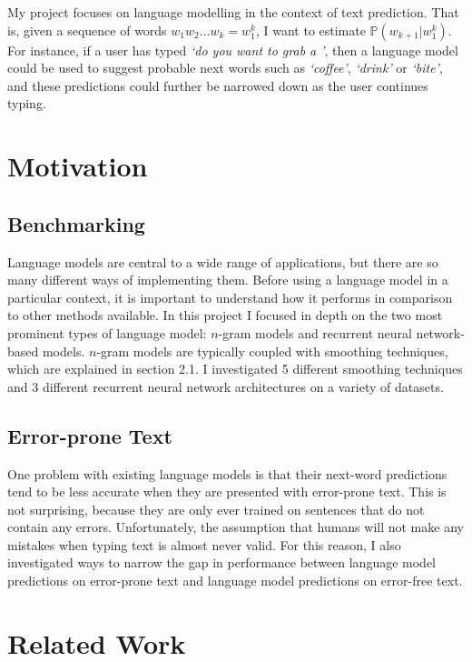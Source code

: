 \documentclass[a4paper, 12pt]{report}
\newcommand{\tit}[1]{\textit{#1}}
\begin{document}
My project focuses on language modelling in the context of text prediction. That is, given a sequence of words $w_1w_2...w_k = w_1^k$, I want to estimate $\mathbb{P}(w_{k + 1} | w_1^k)$. For instance, if a user has typed \tit{`do you want to grab a '}, then a language model could be used to suggest probable next words such as \tit{`coffee'}, \tit{`drink'} or \tit{`bite'}, and these predictions could further be narrowed down as the user continues typing.

\section{Motivation}


\subsection*{Benchmarking}

Language models are central to a wide range of applications, but there are so many different ways of implementing them. Before using a language model in a particular context, it is important to understand how it performs in comparison to other methods available. In this project I focused in depth on the two most prominent types of language model: $n$-gram models and recurrent neural network-based models. $n$-gram models are typically coupled with smoothing techniques, which are explained in section 2.1. I investigated 5 different smoothing techniques and 3 different recurrent neural network architectures on a variety of datasets.

\subsection*{Error-prone Text}

One problem with existing language models is that their next-word predictions tend to be less accurate when they are presented with error-prone text. This is not surprising, because they are only ever trained on sentences that do not contain any errors. Unfortunately, the assumption that humans will not make any mistakes when typing text is almost never valid.  For this reason, I also investigated ways to narrow the gap in performance between language model predictions on error-prone text and language model predictions on error-free text. 

\section{Related Work}
\end{document}
